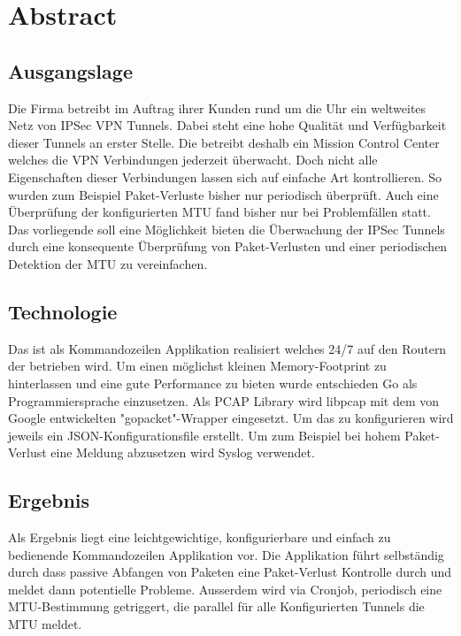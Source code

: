 
\chapter*{Abstract}

\section{Ausgangslage}
Die Firma \osag betreibt im Auftrag ihrer Kunden rund um die Uhr ein weltweites Netz von \acs{IPSec} \acs{VPN} Tunnels. Dabei steht eine hohe Qualität und Verfügbarkeit dieser Tunnels an erster Stelle. Die \osag betreibt deshalb ein Mission Control Center welches die \acs{VPN} Verbindungen jederzeit überwacht. Doch nicht alle Eigenschaften dieser Verbindungen lassen sich auf einfache Art kontrollieren. So wurden zum Beispiel Paket-Verluste bisher nur periodisch überprüft. Auch eine Überprüfung der konfigurierten \acs{MTU} fand bisher nur bei Problemfällen statt. Das vorliegende \tool soll eine Möglichkeit bieten die Überwachung der \acs{IPSec} Tunnels durch eine konsequente Überprüfung von Paket-Verlusten und einer periodischen Detektion der \acs{MTU} zu vereinfachen.

\section{Technologie}
Das \tool ist als Kommandozeilen Applikation realisiert welches 24/7 auf den Routern der \osag betrieben wird. Um einen möglichst kleinen Memory-Footprint zu hinterlassen und eine gute Performance zu bieten wurde entschieden Go als Programmiersprache einzusetzen. Als \acs{PCAP} Library wird libpcap mit dem von Google entwickelten "gopacket"-Wrapper eingesetzt. Um das \tool zu konfigurieren wird jeweils ein JSON-Konfigurationsfile erstellt. Um zum Beispiel bei hohem Paket-Verlust eine Meldung abzusetzen wird Syslog verwendet.

\section{Ergebnis}
Als Ergebnis liegt eine leichtgewichtige, konfigurierbare und einfach zu bedienende Kommandozeilen Applikation vor. Die Applikation führt selbständig durch dass passive Abfangen von Paketen eine Paket-Verlust Kontrolle durch und meldet dann potentielle Probleme. Ausserdem wird via Cronjob, periodisch eine \acs{MTU}-Bestimmung getriggert, die parallel für alle Konfigurierten Tunnels die \acs{MTU} meldet.

